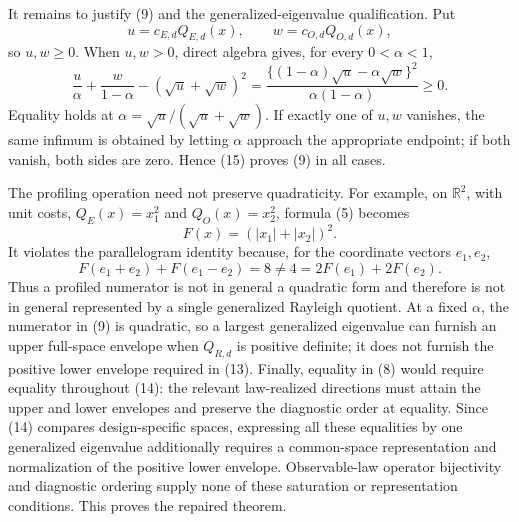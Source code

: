 It remains to justify (9) and the generalized-eigenvalue qualification.  Put
\[
 u=c_{E,d}Q_{E,d}(x),
 \qquad
 w=c_{O,d}Q_{O,d}(x),
\]
so \(u,w\ge0\).  When \(u,w>0\), direct algebra gives, for every \(0<\alpha<1\),
\[
 \frac{u}{\alpha}+\frac{w}{1-\alpha}
 -(\sqrt u+\sqrt w)^2
 =\frac{\{(1-\alpha)\sqrt u-\alpha\sqrt w\}^2}
        {\alpha(1-\alpha)}\ge0.                              \tag{15}
\]
Equality holds at \(\alpha=\sqrt u/(\sqrt u+\sqrt w)\).  If exactly one of \(u,w\) vanishes, the same infimum is obtained by letting \(\alpha\) approach the appropriate endpoint; if both vanish, both sides are zero.  Hence (15) proves (9) in all cases.

The profiling operation need not preserve quadraticity.  For example, on \(\mathbb R^2\), with unit costs, \(Q_E(x)=x_1^2\) and \(Q_O(x)=x_2^2\), formula (5) becomes
\[
 F(x)=(|x_1|+|x_2|)^2.
\]
It violates the parallelogram identity because, for the coordinate vectors \(e_1,e_2\),
\[
 F(e_1+e_2)+F(e_1-e_2)=8
 \ne4=2F(e_1)+2F(e_2).
\]
Thus a profiled numerator is not in general a quadratic form and therefore is not in general represented by a single generalized Rayleigh quotient.  At a fixed \(\alpha\), the numerator in (9) is quadratic, so a largest generalized eigenvalue can furnish an upper full-space envelope when \(Q_{R,d}\) is positive definite; it does not furnish the positive lower envelope required in (13).  Finally, equality in (8) would require equality throughout (14): the relevant law-realized directions must attain the upper and lower envelopes and preserve the diagnostic order at equality.  Since (14) compares design-specific spaces, expressing all these equalities by one generalized eigenvalue additionally requires a common-space representation and normalization of the positive lower envelope.  Observable-law operator bijectivity and diagnostic ordering supply none of these saturation or representation conditions.  This proves the repaired theorem.